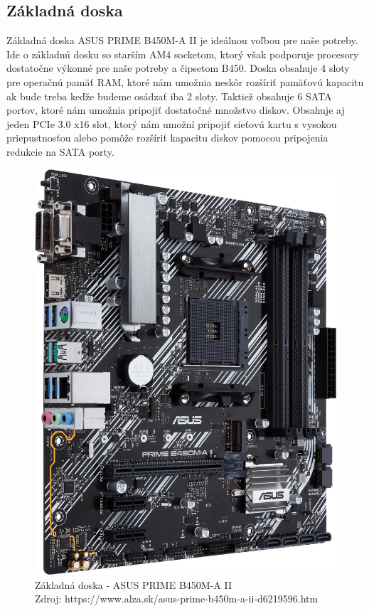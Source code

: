 \documentclass[12pt,oneside,slovak,a4paper]{article}
\begin{document}
\subsection{Základná doska}
Základná doska ASUS PRIME B450M-A II je ideálnou voľbou pre naše potreby. Ide o základnú dosku so starším AM4 socketom, ktorý však podporuje procesory dostatočne výkonné pre naše potreby a čipsetom B450. Doska obsahuje 4 sloty pre operačnú pamäť RAM, ktoré nám umožnia neskôr rozšíriť pamäťovú kapacitu ak bude treba keďže budeme osádzať iba 2 sloty. Taktiež obsahuje 6 SATA portov, ktoré nám umožnia pripojiť dostatočné množstvo diskov. Obsahuje aj jeden PCIe 3.0 x16 slot, ktorý nám umožní pripojiť sieťovú kartu s vysokou priepustnosťou alebo pomôže rozšíriť kapacitu diskov pomocou pripojenia redukcie na SATA porty.

\begin{figure}[H]
	\centering
	\captionsetup{justification=centering,margin=2cm}
	\includegraphics[width=\linewidth]{./images/motherboard.png} %
	\centering
	\caption{Základná doska - ASUS PRIME B450M-A II \\ Zdroj: https://www.alza.sk/asus-prime-b450m-a-ii-d6219596.htm}
\end{figure}
\end{document}
